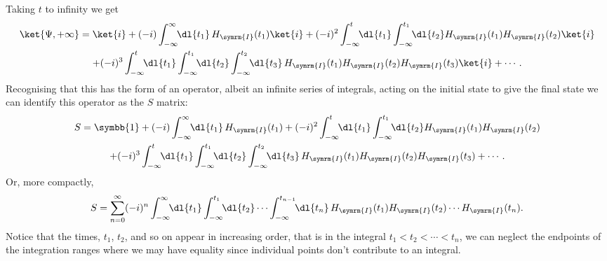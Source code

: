 \documentclass[fleqn]{NotesClass}
\newcommand{\ident}{\symbb{1}}
\newcommand{\interaction}{\symrm{I}}
\begin{document}
    Taking \(t\) to infinity we get
    \begin{multline}
        \ket{\Psi, +\infty} = \ket{i} + (-i) \int_{-\infty}^{\infty} \!\! \dl{t_1} \, H_{\interaction}(t_1) \ket{i} + (-i)^2 \int_{-\infty}^{t} \!\! \dl{t_1} \int_{-\infty}^{t_1} \!\! \dl{t_2} H_{\interaction}(t_1) H_{\interaction}(t_2) \ket{i}\\
        + (-i)^3 \int_{-\infty}^{t} \!\! \dl{t_1} \int_{-\infty}^{t_1} \!\! \dl{t_2} \int_{-\infty}^{t_2} \!\! \dl{t_3} \, H_{\interaction}(t_1) H_{\interaction}(t_2) H_{\interaction}(t_3) \ket{i} + \dotsb.
    \end{multline}
    Recognising that this has the form of an operator, albeit an infinite series of integrals, acting on the initial state to give the final state we can identify this operator as the \(S\) matrix:
    \begin{multline}
        S = \ident + (-i) \int_{-\infty}^{\infty} \!\! \dl{t_1} \, H_{\interaction}(t_1) + (-i)^2 \int_{-\infty}^{t} \!\! \dl{t_1} \int_{-\infty}^{t_1} \!\! \dl{t_2} H_{\interaction}(t_1) H_{\interaction}(t_2)\\
        + (-i)^3 \int_{-\infty}^{t} \!\! \dl{t_1} \int_{-\infty}^{t_1} \!\! \dl{t_2} \int_{-\infty}^{t_2} \!\! \dl{t_3} \, H_{\interaction}(t_1) H_{\interaction}(t_2) H_{\interaction}(t_3) + \dotsb.
    \end{multline}
    Or, more compactly,
    \begin{equation}
        S = \sum_{n = 0}^{\infty} (-i)^n \int_{-\infty}^{\infty} \!\! \dl{t_1} \int_{-\infty}^{t_1} \!\! \dl{t_2} \dotsm \int_{-\infty}^{t_{n-1}} \!\! \dl{t_n} \, H_{\interaction}(t_1) H_{\interaction}(t_2) \dotsm H_{\interaction}(t_n).
    \end{equation}
    Notice that the times, \(t_1\), \(t_2\), and so on appear in increasing order, that is in the integral \(t_1 < t_2 < \dotsb < t_n\), we can neglect the endpoints of the integration ranges where we may have equality since individual points don't contribute to an integral.
    
\end{document}
